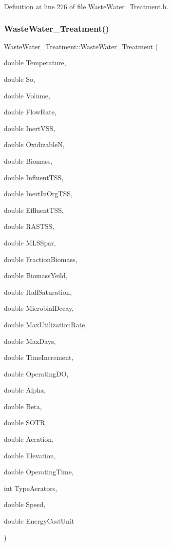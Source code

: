 Definition at line 276 of file Waste\+Water\+\_\+\+Treatment.\+h.

\mbox{\label{class_waste_water___treatment_aec57a97589b18d14aecd786271b8b5be}} 
\subsubsection{\texorpdfstring{Waste\+Water\+\_\+\+Treatment()}{WasteWater\_Treatment()}\hspace{0.1cm}{\footnotesize\ttfamily [3/3]}}
{\footnotesize\ttfamily Waste\+Water\+\_\+\+Treatment\+::\+Waste\+Water\+\_\+\+Treatment (\begin{DoxyParamCaption}\item[{double}]{Temperature,  }\item[{double}]{So,  }\item[{double}]{Volume,  }\item[{double}]{Flow\+Rate,  }\item[{double}]{Inert\+V\+SS,  }\item[{double}]{OxidizableN,  }\item[{double}]{Biomass,  }\item[{double}]{Influent\+T\+SS,  }\item[{double}]{Inert\+In\+Org\+T\+SS,  }\item[{double}]{Effluent\+T\+SS,  }\item[{double}]{R\+A\+S\+T\+SS,  }\item[{double}]{M\+L\+S\+Spar,  }\item[{double}]{Fraction\+Biomass,  }\item[{double}]{Biomass\+Yeild,  }\item[{double}]{Half\+Saturation,  }\item[{double}]{Microbial\+Decay,  }\item[{double}]{Max\+Utilization\+Rate,  }\item[{double}]{Max\+Days,  }\item[{double}]{Time\+Increment,  }\item[{double}]{Operating\+DO,  }\item[{double}]{Alpha,  }\item[{double}]{Beta,  }\item[{double}]{S\+O\+TR,  }\item[{double}]{Aeration,  }\item[{double}]{Elevation,  }\item[{double}]{Operating\+Time,  }\item[{int}]{Type\+Aerators,  }\item[{double}]{Speed,  }\item[{double}]{Energy\+Cost\+Unit }\end{DoxyParamCaption})\hspace{0.3cm}{\ttfamily [inline]}}


